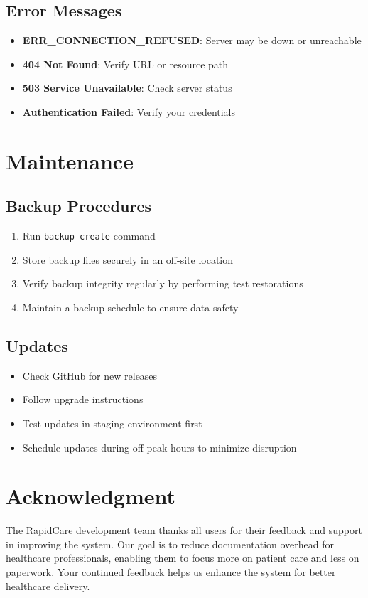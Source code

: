 \documentclass[12pt, titlepage]{article}
\begin{document}
\subsection{Error Messages}
\begin{itemize}
\item \textbf{ERR\_CONNECTION\_REFUSED}: Server may be down or unreachable
\item \textbf{404 Not Found}: Verify URL or resource path
\item \textbf{503 Service Unavailable}: Check server status
\item \textbf{Authentication Failed}: Verify your credentials
\end{itemize}

\section{Maintenance}
\subsection{Backup Procedures}
\begin{enumerate}
\item Run \texttt{backup create} command
\item Store backup files securely in an off-site location
\item Verify backup integrity regularly by performing test restorations
\item Maintain a backup schedule to ensure data safety
\end{enumerate}

\subsection{Updates}
\begin{itemize}
\item Check GitHub for new releases
\item Follow upgrade instructions
\item Test updates in staging environment first
\item Schedule updates during off-peak hours to minimize disruption
\end{itemize}

\section*{Acknowledgment}
The RapidCare development team thanks all users for their feedback and support in improving the system. Our goal is to reduce documentation overhead for healthcare professionals, enabling them to focus more on patient care and less on paperwork. Your continued feedback helps us enhance the system for better healthcare delivery.
\end{document}
